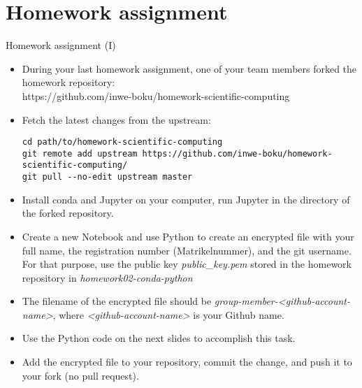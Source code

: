 
\section{Homework assignment}

\begin{frame}[fragile]{Homework assignment (I)}

	\begin{itemize}
		\item During your last homework assignment, one of your team members forked the homework repository:\\
            https://github.com/inwe-boku/homework-scientific-computing
		\item Fetch the latest changes from the upstream:
            {\scriptsize
            \begin{verbatim}
cd path/to/homework-scientific-computing
git remote add upstream https://github.com/inwe-boku/homework-scientific-computing/
git pull --no-edit upstream master\end{verbatim}
            }
		\item Install conda and Jupyter on your computer, run Jupyter in the directory of the
            forked repository.
		\item Create a new Notebook and use Python to create an encrypted file with your full name, the registration number (Matrikelnummer), and the git username. For that purpose, use the public key \textit{public\_key.pem} stored in the homework repository in \textit{homework02-conda-python}
		\item The filename of the encrypted file should be
            \textit{group-member-<github-account-name>}, where \textit{<github-account-name>} is
            your Github name.
		\item Use the Python code on the next slides to accomplish this task.
		\item Add the encrypted file to your repository, commit the change, and push it to your
            fork (no pull request).
	\end{itemize}


\end{frame}

